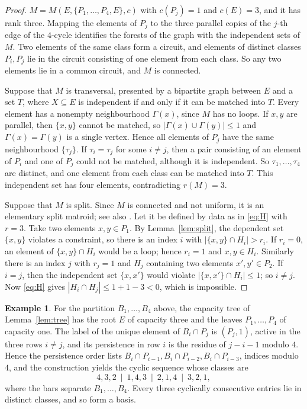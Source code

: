 \documentclass[11pt]{amsart}
\theoremstyle{definition}
\newtheorem{example}[theorem]{Example}
\theoremstyle{remark}
\numberwithin{equation}{section}
\begin{document}
\begin{proof}
$M=M(E,\{P_1,\dots,P_4,E\},c)$ with $c(P_j)=1$ and $c(E)=3$, and it has rank three. Mapping the elements of $P_j$ to the three parallel copies of the $j$-th edge of the $4$-cycle identifies the forests of the graph with the independent sets of $M$. Two elements of the same class form a circuit, and elements of distinct classes $P_i,P_j$ lie in the circuit consisting of one element from each class. So any two elements lie in a common circuit, and $M$ is connected.

Suppose that $M$ is transversal, presented by a bipartite graph between $E$ and a set $T$, where $X\subseteq E$ is independent if and only if it can be matched into $T$. Every element has a nonempty neighbourhood $\Gamma(x)$, since $M$ has no loops. If $x,y$ are parallel, then $\{x,y\}$ cannot be matched, so $|\Gamma(x)\cup\Gamma(y)|\le1$ and $\Gamma(x)=\Gamma(y)$ is a single vertex. Hence all elements of $P_j$ have the same neighbourhood $\{\tau_j\}$. If $\tau_i=\tau_j$ for some $i\ne j$, then a pair consisting of an element of $P_i$ and one of $P_j$ could not be matched, although it is independent. So $\tau_1,\dots,\tau_4$ are distinct, and one element from each class can be matched into $T$. This independent set has four elements, contradicting $r(M)=3$.

Suppose that $M$ is split. Since $M$ is connected and not uniform, it is an elementary split matroid; see also \cite[Lemma~6]{BJM}. Let it be defined by data as in \eqref{eq:H} with $r=3$. Take two elements $x,y\in P_1$. By Lemma~\ref{lem:split}, the dependent set $\{x,y\}$ violates a constraint, so there is an index $i$ with $|\{x,y\}\cap H_i|>r_i$. If $r_i=0$, an element of $\{x,y\}\cap H_i$ would be a loop; hence $r_i=1$ and $x,y\in H_i$. Similarly there is an index $j$ with $r_j=1$ and $H_j$ containing two elements $x',y'\in P_2$. If $i=j$, then the independent set $\{x,x'\}$ would violate $|\{x,x'\}\cap H_i|\le1$; so $i\ne j$. Now \eqref{eq:H} gives $|H_i\cap H_j|\le1+1-3<0$, which is impossible.
\end{proof}

\begin{example}\label{ex:output}
For the partition $B_1,\dots,B_4$ above, the capacity tree of Lemma~\ref{lem:tree} has the root $E$ of capacity three and the leaves $P_1,\dots,P_4$ of capacity one. The label of the unique element of $B_i\cap P_j$ is $(P_j,1)$, active in the three rows $i\ne j$, and its persistence in row $i$ is the residue of $j-i-1$ modulo $4$. Hence the persistence order lists $B_i\cap P_{i-1},B_i\cap P_{i-2},B_i\cap P_{i-3}$, indices modulo $4$, and the construction yields the cyclic sequence whose classes are
\[
4,3,2\ \mid\ 1,4,3\ \mid\ 2,1,4\ \mid\ 3,2,1,
\]
where the bars separate $B_1,\dots,B_4$. Every three cyclically consecutive entries lie in distinct classes, and so form a basis.
\end{example}
\end{document}
